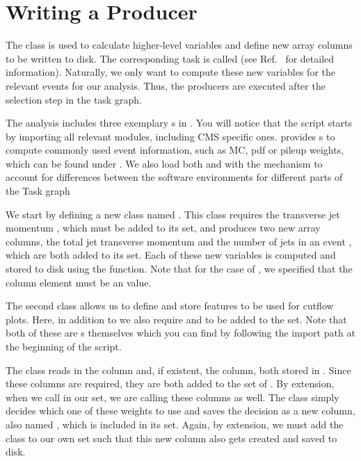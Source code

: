 \section{Writing a Producer}\label{sec:producer}

The  class is used to calculate higher-level variables and define new array columns to be written to disk.
The corresponding task is called  (see Ref.~\cite{cf_repo} for detailed information).
Naturally, we only want to compute these new variables for the relevant events for our analysis.
Thus, the producers are executed after the selection step in the task graph. 

The  analysis includes three exemplary s in .
You will notice that the script starts by importing all relevant modules, including CMS specific ones.
\columnflow provides s to compute commonly used event information, such as MC, pdf or pileup weights, which can be found under .
We also load both  and  with the  mechanism to account for differences between the software environments for different parts of the Task graph

We start by defining a new  class named . This class requires the transverse jet momentum , which must be added to its  set, and produces two new array columns, the total jet transverse momentum  and the number of jets in an event , which are both added to its  set. Each of these new variables is computed and stored to disk using the  function. Note that for the case of , we specified that the column element must be an  value.

The second  class  allows us to define and store features to be used for cutflow plots. Here, in addition to  we also require  and  to be added to the  set. Note that both of these are s themselves which you can find by following the import path at the beginning of the script. 

The   class  reads in the  column and, if existent, the  column, both stored in . Since these columns are required, they are both added to the  set of . By extension, when we call  in our  set, we are calling these columns as well. The  class simply decides which one of these weights to use and saves the decision as a new column, also named , which is included in its  set. Again, by extension, we must add the  class to our own  set such that this new column also gets created and saved to disk. 

